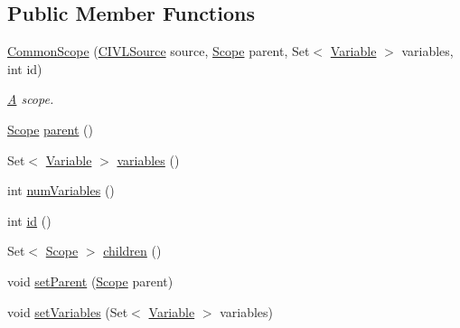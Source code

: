 \subsection*{Public Member Functions}
\begin{DoxyCompactItemize}
\item 
\hyperlink{classedu_1_1udel_1_1cis_1_1vsl_1_1civl_1_1model_1_1common_1_1CommonScope_ab3a2e482c2e3445f8a3f1278cb5163f9}{Common\+Scope} (\hyperlink{interfaceedu_1_1udel_1_1cis_1_1vsl_1_1civl_1_1model_1_1IF_1_1CIVLSource}{C\+I\+V\+L\+Source} source, \hyperlink{interfaceedu_1_1udel_1_1cis_1_1vsl_1_1civl_1_1model_1_1IF_1_1Scope}{Scope} parent, Set$<$ \hyperlink{interfaceedu_1_1udel_1_1cis_1_1vsl_1_1civl_1_1model_1_1IF_1_1variable_1_1Variable}{Variable} $>$ variables, int id)
\begin{DoxyCompactList}\small\item\em \hyperlink{structA}{A} scope. \end{DoxyCompactList}\item 
\hyperlink{interfaceedu_1_1udel_1_1cis_1_1vsl_1_1civl_1_1model_1_1IF_1_1Scope}{Scope} \hyperlink{classedu_1_1udel_1_1cis_1_1vsl_1_1civl_1_1model_1_1common_1_1CommonScope_aef4f55039b18a9c621ceb4c3b1ec817c}{parent} ()
\item 
Set$<$ \hyperlink{interfaceedu_1_1udel_1_1cis_1_1vsl_1_1civl_1_1model_1_1IF_1_1variable_1_1Variable}{Variable} $>$ \hyperlink{classedu_1_1udel_1_1cis_1_1vsl_1_1civl_1_1model_1_1common_1_1CommonScope_acfe497d1063c247f58c9a7ae3a3cb87d}{variables} ()
\item 
int \hyperlink{classedu_1_1udel_1_1cis_1_1vsl_1_1civl_1_1model_1_1common_1_1CommonScope_a01617248ede0ef6cd3effb30634b3d50}{num\+Variables} ()
\item 
int \hyperlink{classedu_1_1udel_1_1cis_1_1vsl_1_1civl_1_1model_1_1common_1_1CommonScope_a779f12dcb54f7fe36ec9bfa11cc30545}{id} ()
\item 
Set$<$ \hyperlink{interfaceedu_1_1udel_1_1cis_1_1vsl_1_1civl_1_1model_1_1IF_1_1Scope}{Scope} $>$ \hyperlink{classedu_1_1udel_1_1cis_1_1vsl_1_1civl_1_1model_1_1common_1_1CommonScope_a779752ac738d4229341d27a38a84ab2c}{children} ()
\item 
void \hyperlink{classedu_1_1udel_1_1cis_1_1vsl_1_1civl_1_1model_1_1common_1_1CommonScope_ac60a148edaca8521f4a19d1896864ef5}{set\+Parent} (\hyperlink{interfaceedu_1_1udel_1_1cis_1_1vsl_1_1civl_1_1model_1_1IF_1_1Scope}{Scope} parent)
\item 
void \hyperlink{classedu_1_1udel_1_1cis_1_1vsl_1_1civl_1_1model_1_1common_1_1CommonScope_a3e4f9905fcfe41dfe9d25f8e51f34c2b}{set\+Variables} (Set$<$ \hyperlink{interfaceedu_1_1udel_1_1cis_1_1vsl_1_1civl_1_1model_1_1IF_1_1variable_1_1Variable}{Variable} $>$ variables)

\end{DoxyCompactItemize}
